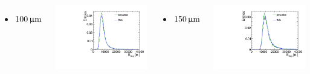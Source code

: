\begin{frame}
\begin{columns}
    \begin{itemize}
    \item $100\,\micron$
    \end{itemize}
    \centering
    \includegraphics[width=\textwidth]{../figures/TestBeam/100micron_Edep.pdf}

    \begin{itemize}
    \item $150\,\micron$
    \end{itemize}
    \centering
    \includegraphics[width=\textwidth]{../figures/TestBeam/150micron_Edep.pdf}
  \end{columns}

\end{frame}

